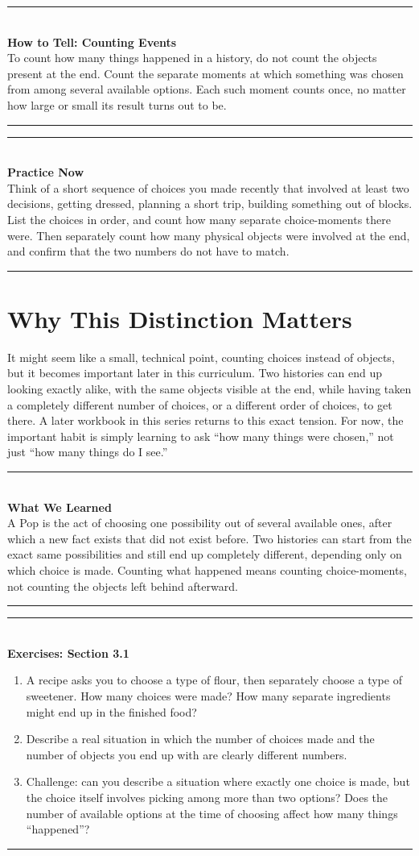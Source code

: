 \documentclass[11pt]{book}
\newenvironment{algorithmproc}[1]{%
\vspace{0.6em}\noindent\rule{\linewidth}{0.6pt}\\[0.2em]\textbf{How to Tell: #1}\\[0.3em]}%
{\\[0.2em]\noindent\rule{\linewidth}{0.6pt}\vspace{0.6em}}
\newenvironment{practicenow}{%
\vspace{0.6em}\noindent\rule{\linewidth}{0.6pt}\\[0.2em]\textbf{Practice Now}\\[0.3em]}%
{\\[0.2em]\noindent\rule{\linewidth}{0.6pt}\vspace{0.6em}}
\newenvironment{exercisebox}[1]{%
\vspace{0.8em}\noindent\rule{\linewidth}{0.6pt}\\[0.2em]\textbf{Exercises: #1}\\[0.3em]%
\begin{enumerate}[label=\arabic*., itemsep=0.4em]}%
{\end{enumerate}\noindent\rule{\linewidth}{0.6pt}\vspace{0.6em}}
\newenvironment{summarybox}{%
\vspace{0.6em}\noindent\rule{\linewidth}{0.6pt}\\[0.2em]\textbf{What We Learned}\\[0.3em]}%
{\\[0.2em]\noindent\rule{\linewidth}{0.6pt}\vspace{0.6em}}
\begin{document}
\begin{algorithmproc}{Counting Events}
To count how many things happened in a history, do not count the objects present at the end. Count the separate moments at which something was chosen from among several available options. Each such moment counts once, no matter how large or small its result turns out to be.
\end{algorithmproc}

\begin{practicenow}
Think of a short sequence of choices you made recently that involved at least two decisions, getting dressed, planning a short trip, building something out of blocks. List the choices in order, and count how many separate choice-moments there were. Then separately count how many physical objects were involved at the end, and confirm that the two numbers do not have to match.
\end{practicenow}

\section{Why This Distinction Matters}

It might seem like a small, technical point, counting choices instead of objects, but it becomes important later in this curriculum. Two histories can end up looking exactly alike, with the same objects visible at the end, while having taken a completely different number of choices, or a different order of choices, to get there. A later workbook in this series returns to this exact tension. For now, the important habit is simply learning to ask ``how many things were chosen,'' not just ``how many things do I see.''

\begin{summarybox}
A Pop is the act of choosing one possibility out of several available ones, after which a new fact exists that did not exist before. Two histories can start from the exact same possibilities and still end up completely different, depending only on which choice is made. Counting what happened means counting choice-moments, not counting the objects left behind afterward.
\end{summarybox}

\begin{exercisebox}{Section 3.1}
\item A recipe asks you to choose a type of flour, then separately choose a type of sweetener. How many choices were made? How many separate ingredients might end up in the finished food?
\item Describe a real situation in which the number of choices made and the number of objects you end up with are clearly different numbers.
\item Challenge: can you describe a situation where exactly one choice is made, but the choice itself involves picking among more than two options? Does the number of available options at the time of choosing affect how many things ``happened''?
\end{exercisebox}
\end{document}
